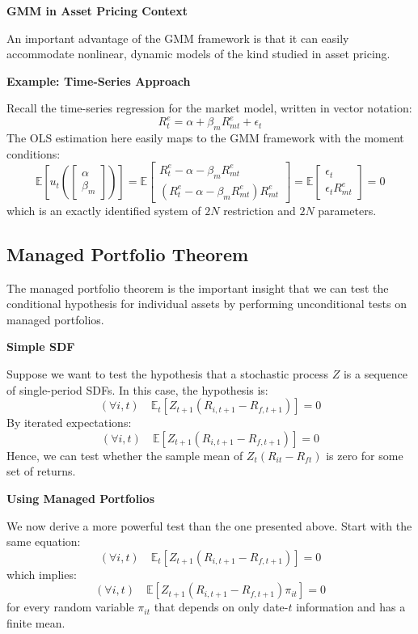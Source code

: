 \documentclass[
]{book}
\begin{document}
\textbf{GMM in Asset Pricing Context}

An important advantage of the GMM framework is that it can easily accommodate nonlinear, dynamic models of the kind studied in asset pricing.

\textbf{Example: Time-Series Approach}

Recall the time-series regression for the market model, written in vector notation:
\[
R_t^e = \alpha + \beta_m R_{mt}^e + \epsilon_t
\]
The OLS estimation here easily maps to the GMM framework with the moment conditions:
\[
\mathbb{E}\left[u_{t}\left(\left[\begin{array}{c}
\alpha\\
\beta_{m}
\end{array}\right]\right)\right]=\mathbb{E}\left[\begin{array}{c}
R_{t}^{e}-\alpha-\beta_{m}R_{mt}^{e}\\
\left(R_{t}^{e}-\alpha-\beta_{m}R_{mt}^{e}\right)R_{mt}^{e}
\end{array}\right]=\mathbb{E}\left[\begin{array}{c}
\epsilon_{t}\\
\epsilon_{t}R_{mt}^{e}
\end{array}\right]=0
\]
which is an exactly identified system of \(2N\) restriction and \(2N\) parameters.

\hypertarget{managed-portfolio-theorem}{%
\subsection{Managed Portfolio Theorem}\label{managed-portfolio-theorem}}

The managed portfolio theorem is the important insight that we can test the conditional hypothesis for individual assets by performing unconditional tests on managed portfolios.

\textbf{Simple SDF}

Suppose we want to test the hypothesis that a stochastic process \(Z\) is a sequence of single-period SDFs. In this case, the hypothesis is:
\[
\left(\forall i,t\right)\quad\mathbb{E}_{t}\left[Z_{t+1}\left(R_{i,t+1}-R_{f,t+1}\right)\right]=0
\]
By iterated expectations:
\[
\left(\forall i,t\right)\quad\mathbb{E}\left[Z_{t+1}\left(R_{i,t+1}-R_{f,t+1}\right)\right]=0
\]
Hence, we can test whether the sample mean of \(Z_t(R_{it} - R_{ft})\) is zero for some set of returns.

\textbf{Using Managed Portfolios}

We now derive a more powerful test than the one presented above. Start with the same equation:
\[
\left(\forall i,t\right)\quad\mathbb{E}_{t}\left[Z_{t+1}\left(R_{i,t+1}-R_{f,t+1}\right)\right]=0
\]
which implies:
\[
\left(\forall i,t\right)\quad\mathbb{E}\left[Z_{t+1}\left(R_{i,t+1}-R_{f,t+1}\right)\pi_{it}\right]=0
\]
for every random variable \(\pi_{it}\) that depends on only date-\(t\) information and has a finite mean.
\end{document}
